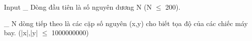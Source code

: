 Input
\_ Dòng đầu tiên là số nguyên dương N (N $\le$ 200).  

   \_ N dòng tiếp theo là các cặp số nguyên (x,y) cho biết tọa độ của các chiếc máy bay. (|x|,|y| $\le$ 1000000000)